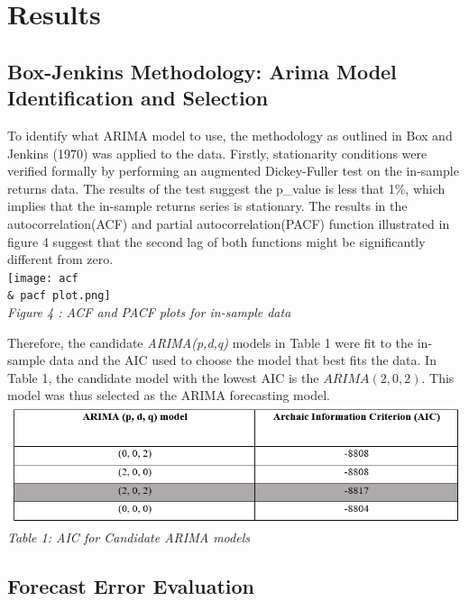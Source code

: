 \documentclass[12pt,a4paper]{article}
\numberwithin{equation}{section}
\numberwithin{figure}{section}
\numberwithin{table}{section}
\begin{document}
\section{Results}\label{results}

\subsection{Box-Jenkins Methodology: Arima Model Identification and
Selection}\label{box-jenkins-methodology-arima-model-identification-and-selection}

To identify what ARIMA model to use, the methodology as outlined in Box
and Jenkins (1970) was applied to the data. Firstly, stationarity
conditions were verified formally by performing an augmented
Dickey-Fuller test on the in-sample returns data. The results of the
test suggest the p\_value is less that 1\%, which implies that the
in-sample returns series is stationary. The results in the
autocorrelation(ACF) and partial autocorrelation(PACF) function
illustrated in figure 4 suggest that the second lag of both functions
might be significantly different from zero.\\
\texttt{[image: acf \\\& pacf plot.png]}\\
\emph{Figure 4 : ACF and PACF plots for in-sample data}

Therefore, the candidate \emph{ARIMA(p,d,q)} models in Table 1 were fit
to the in-sample data and the AIC used to choose the model that best
fits the data. In Table 1, the candidate model with the lowest AIC is
the \(ARIMA(2,0,2)\). This model was thus selected as the ARIMA
forecasting model.\\
\includegraphics[width=1.00000\textwidth]{AIC.png}\\
\emph{Table 1: AIC for Candidate ARIMA models}

\subsection{Forecast Error Evaluation}\label{forecast-error-evaluation}
\end{document}

